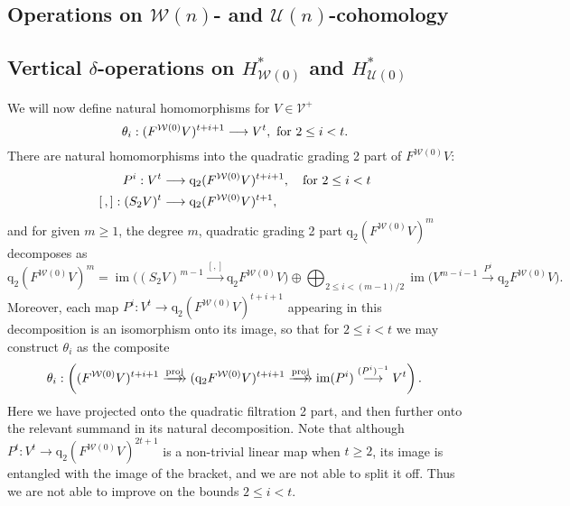 \documentclass[11pt]{amsart} \renewcommand{\baselinestretch}{1.2}
\theoremstyle{plain}
\numberwithin{equation}{section} %
\theoremstyle{plain}
\numberwithin{equation}{chapter} %
\DeclareMathOperator{\Hom}{Hom}
\DeclareMathOperator{\im}{im}
\renewcommand{\to}{\longrightarrow}
\newcommand{\calU}{\mathcal{U}}
\newcommand{\calV}{\mathcal{V}}
\newcommand{\calw}{\mathcal{W}}
\newcommand{\vect}[2]{\calV^{#1}_{#2}}
\newcommand{\quadgrad}[1]{\mathrm{q}_{#1}}
\newcommand{\F}{\mathbb{F}}
\newcommand{\Ftwo}{\F_2}
\newcommand{\SectionOrChapter}[1]{\section{\textbf{#1}}}
\newcommand{\SubsectionOrSection}[1]{\subsection{#1}}
\begin{document}
\begin{Cohomology Operations for W and U}
\SectionOrChapter{Operations on $\calw(n)$- and $\calU(n)$-cohomology}
\label{Cohomology Operations for W and U}



\SubsectionOrSection{Vertical $\delta$-operations on $H^*_{\calw(0)}$ and $H^*_{\calU(0)}$}
\label{vert delta on w0 u0}
We will now define natural homomorphisms for $V\in \vect{+}{}$
\[\theta_i:(F^{\calw(0)}V)^{t+i+1}\to V^{t}, \textup{ for $2\leq i<t$}.\]
There are natural homomorphisms into the quadratic grading 2 part of $F^{\calw(0)}V$:
\begin{align*}
P^i:V^{t}&\to \quadgrad{2}(F^{\calw(0)}V)^{t+i+1}, \textup{\quad  for $2\leq i<t$}\\
[\,,]:(S_2V)^{t}&\to \quadgrad{2}(F^{\calw(0)}V)^{t+1},
\end{align*}
and for given $m\geq1$, the degree $m$, quadratic grading 2 part $\quadgrad{2}(F^{\calw(0)}V)^m$ decomposes as
%
\[\quadgrad{2}(F^{\calw(0)}V)^{m}=%
\im \bigl((S_2V)^{m-1}\overset{[,]}{\to} \quadgrad{2}F^{\calw(0)}V\bigr)%
\oplus\bigoplus_{\!\!\!\!\!\!2\leq i< (m-1)/2\!\!\!\!\!\!}\im \bigl(V^{m-i-1}\overset{P^i}{\to}\quadgrad{2}F^{\calw(0)}V\bigr).\]
Moreover, each map $P^i:V^t\to \quadgrad{2}(F^{\calw(0)}V)^{t+i+1}$ appearing in this decomposition is an isomorphism onto its image, so that for $2\leq i <t$ we may construct $\theta_i$ as the composite
\[\theta_i:\left((F^{\calw(0)}V)^{t+i+1}\overset{\textup{proj}}{\makebox[.06ex][l]{$\to$}\to} (\quadgrad{2}F^{\calw(0)}V)^{t+i+1}\overset{\textup{proj}}{\makebox[.06ex][l]{$\to$}\to} \im (P^i)\overset{(P^i)^{-1}}{\to}V^{t}\right).\]
Here we have projected onto the quadratic filtration 2 part, and then further onto the relevant summand in its natural decomposition. Note that although $P^t:V^t\to \quadgrad{2}(F^{\calw(0)}V)^{2t+1}$ is a non-trivial linear map when $t\geq2$, its image is entangled with the image of the bracket, and we are not able to split it off. Thus we are not able to improve on the bounds $2\leq i< t$.

\end{Cohomology Operations for W and U}
\end{document}
